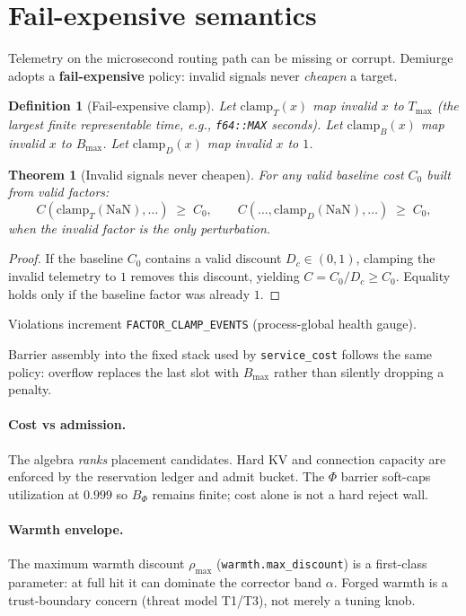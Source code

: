 \documentclass[11pt,a4paper]{article}
\newtheorem{theorem}{Theorem}
\newtheorem{definition}{Definition}
\begin{document}
\section{Fail-expensive semantics}

Telemetry on the microsecond routing path can be missing or corrupt.
Demiurge adopts a \textbf{fail-expensive} policy: invalid signals never
\emph{cheapen} a target.

\begin{definition}[Fail-expensive clamp]
Let $\mathrm{clamp}_T(x)$ map invalid $x$ to $T_{\max}$ (the largest finite
representable time, e.g., \texttt{f64::MAX} seconds).
Let $\mathrm{clamp}_B(x)$ map invalid $x$ to $B_{\max}$.
Let $\mathrm{clamp}_D(x)$ map invalid $x$ to $1$.
\end{definition}

\begin{theorem}[Invalid signals never cheapen]\label{thm:fail}
For any valid baseline cost $C_0$ built from valid factors:
\[
  C(\mathrm{clamp}_T(\mathrm{NaN}), \ldots) \;\ge\; C_0,
  \qquad
  C(\ldots, \mathrm{clamp}_D(\mathrm{NaN}), \ldots) \;\ge\; C_0,
\]
when the invalid factor is the only perturbation.
\end{theorem}

\begin{proof}
If the baseline $C_0$ contains a valid discount $D_c \in (0,1)$, clamping
the invalid telemetry to $1$ removes this discount, yielding
$C = C_0 / D_c \ge C_0$. Equality holds only if the baseline factor was
already $1$.
\end{proof}

Violations increment \texttt{FACTOR\_CLAMP\_EVENTS} (process-global health gauge).

Barrier assembly into the fixed stack used by \texttt{service\_cost} follows
the same policy: overflow replaces the last slot with $B_{\max}$ rather than
silently dropping a penalty.

\paragraph{Cost vs admission.}
The algebra \emph{ranks} placement candidates. Hard KV and connection
capacity are enforced by the reservation ledger and admit bucket.
The $\Phi$ barrier soft-caps utilization at $0.999$ so $B_\Phi$ remains
finite; cost alone is not a hard reject wall.

\paragraph{Warmth envelope.}
The maximum warmth discount $\rho_{\max}$ (\texttt{warmth.max\_discount})
is a first-class parameter: at full hit it can dominate the corrector
band $\alpha$. Forged warmth is a trust-boundary concern (threat model T1/T3),
not merely a tuning knob.
\end{document}
